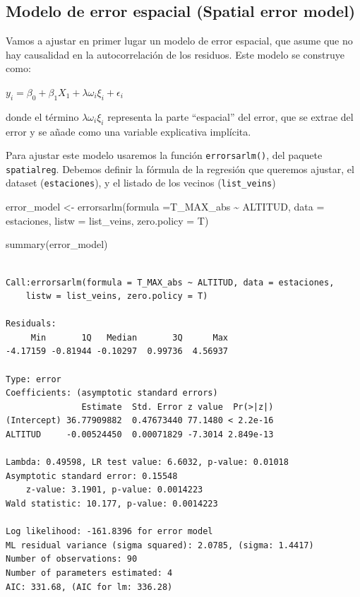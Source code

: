 \documentclass[
  letterpaper,
  DIV=11,
  numbers=noendperiod]{scrreprt}
\newenvironment{Shaded}{\begin{snugshade}}{\end{snugshade}}
\newcommand{\AttributeTok}[1]{\textcolor[rgb]{0.40,0.45,0.13}{#1}}
\newcommand{\FunctionTok}[1]{\textcolor[rgb]{0.28,0.35,0.67}{#1}}
\newcommand{\NormalTok}[1]{\textcolor[rgb]{0.00,0.23,0.31}{#1}}
\newcommand{\OtherTok}[1]{\textcolor[rgb]{0.00,0.23,0.31}{#1}}
\newcommand{\SpecialCharTok}[1]{\textcolor[rgb]{0.37,0.37,0.37}{#1}}
\begin{document}
\hypertarget{modelo-de-error-espacial-spatial-error-model}{%
\subsection{Modelo de error espacial (Spatial error
model)}\label{modelo-de-error-espacial-spatial-error-model}}

Vamos a ajustar en primer lugar un modelo de error espacial, que asume
que no hay causalidad en la autocorrelación de los residuos. Este modelo
se construye como:

\(y_i= \beta_0 + \beta_1X_1+\lambda\omega_i\xi_i+\epsilon_i\)

donde el término \(\lambda\omega_i\xi_i\) representa la parte
``espacial'' del error, que se extrae del error y se añade como una
variable explicativa implícita.

Para ajustar este modelo usaremos la función \texttt{errorsarlm()}, del
paquete \texttt{spatialreg}. Debemos definir la fórmula de la regresión
que queremos ajustar, el dataset (\texttt{estaciones}), y el listado de
los vecinos (\texttt{list\_veins})

\begin{Shaded}
\begin{Highlighting}[]
\NormalTok{error\_model }\OtherTok{\textless{}{-}} \FunctionTok{errorsarlm}\NormalTok{(}\AttributeTok{formula =}\NormalTok{T\_MAX\_abs }\SpecialCharTok{\textasciitilde{}}\NormalTok{ ALTITUD, }\AttributeTok{data =}\NormalTok{ estaciones, }\AttributeTok{listw =}\NormalTok{ list\_veins, }\AttributeTok{zero.policy =}\NormalTok{ T)}

\FunctionTok{summary}\NormalTok{(error\_model)}
\end{Highlighting}
\end{Shaded}

\begin{verbatim}

Call:errorsarlm(formula = T_MAX_abs ~ ALTITUD, data = estaciones, 
    listw = list_veins, zero.policy = T)

Residuals:
     Min       1Q   Median       3Q      Max 
-4.17159 -0.81944 -0.10297  0.99736  4.56937 

Type: error 
Coefficients: (asymptotic standard errors) 
               Estimate  Std. Error z value  Pr(>|z|)
(Intercept) 36.77909882  0.47673440 77.1480 < 2.2e-16
ALTITUD     -0.00524450  0.00071829 -7.3014 2.849e-13

Lambda: 0.49598, LR test value: 6.6032, p-value: 0.01018
Asymptotic standard error: 0.15548
    z-value: 3.1901, p-value: 0.0014223
Wald statistic: 10.177, p-value: 0.0014223

Log likelihood: -161.8396 for error model
ML residual variance (sigma squared): 2.0785, (sigma: 1.4417)
Number of observations: 90 
Number of parameters estimated: 4 
AIC: 331.68, (AIC for lm: 336.28)
\end{verbatim}
\end{document}
